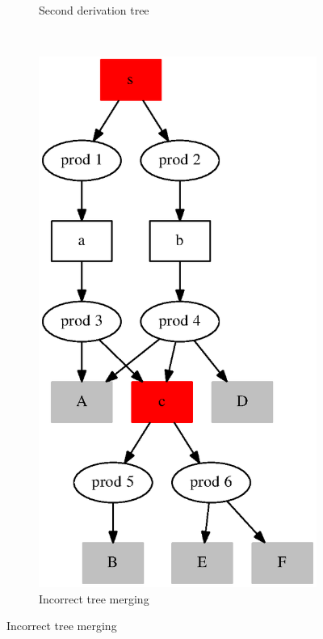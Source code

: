 \documentclass{acm_proc_article-sp}
\begin{document}
\begin{figure}[h!]
\begin{center}
\begin{subfigure}{0.2\textwidth}
    	\caption{Second derivation tree}
    	\label{tree_sql_2}
    \end{subfigure}
    \\
    \begin{subfigure}{0.2\textwidth}      
       \includegraphics[scale=0.3]{graphs/SPPF_proof_incorrect.eps}    
    	\caption{Incorrect tree merging}

\end{subfigure}
\end{center}
\end{figure}
\end{document}
